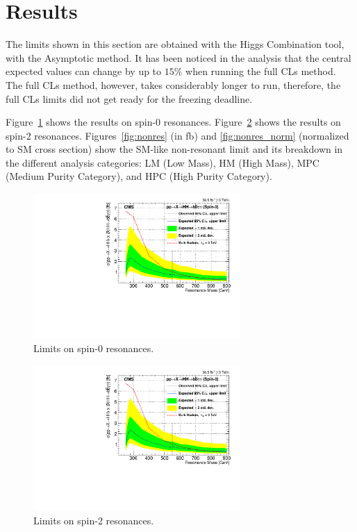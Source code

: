 \section{Results}
\label{sec:results}

The limits shown in this section are obtained with the Higgs Combination tool, with the Asymptotic method. 
It has been noticed in the analysis that the central expected values can change by up to $15\%$ when running the full CLs method. 
The full CLs method, however, takes considerably longer to run, therefore, the full CLs limits did not get ready for the freezing deadline. 

Figure~\ref{fig:result_radion} shows the results on spin-0 resonances.
Figure~\ref{fig:result_graviton} shows the results on spin-2
resonances.  Figures~\ref{fig:nonres} (in fb) and
\ref{fig:nonres_norm} (normalized to SM cross section) show the
SM-like non-resonant limit and its breakdown in the different analysis
categories: LM (Low Mass), HM (High Mass), MPC (Medium Purity
Category), and HPC (High Purity Category).

\begin{figure}[thb]
  \centering
  \includegraphics[width=0.7\textwidth]{figures/sec-results/LimsRadionLMHM.pdf}\hfil
  \caption{Limits on spin-0 resonances.}
  \label{fig:result_radion}
\end{figure}

\begin{figure}[thb]
  \centering
  \includegraphics[width=0.7\textwidth]{figures/sec-results/LimsRadionLMHM.pdf}\hfil
  \caption{Limits on spin-2 resonances.}
  \label{fig:result_graviton}
\end{figure}

